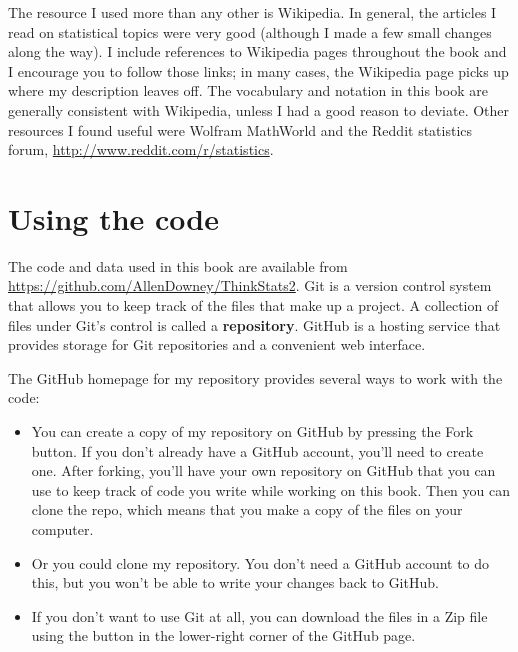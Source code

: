 \documentclass[12pt]{book}
\begin{document}
The resource I used more than any other is Wikipedia.  In general, the
articles I read on statistical topics were very good (although I made
a few small changes along the way).  I include references to Wikipedia
pages throughout the book and I encourage you to follow those links;
in many cases, the Wikipedia page picks up where my description leaves
off.  The vocabulary and notation in this book are generally
consistent with Wikipedia, unless I had a good reason to deviate.
Other resources I found useful were Wolfram MathWorld and 
the Reddit statistics forum, \url{http://www.reddit.com/r/statistics}.


\section{Using the code}
\label{code}

The code and data used in this book are available from
\url{https://github.com/AllenDowney/ThinkStats2}.  Git is a version
control system that allows you to keep track of the files that
make up a project.  A collection of files under Git's control is
called a {\bf repository}.  GitHub is a hosting service that provides
storage for Git repositories and a convenient web interface.

The GitHub homepage for my repository provides several ways to
work with the code:

\begin{itemize}

\item You can create a copy of my repository
on GitHub by pressing the {\sf Fork} button.  If you don't already
have a GitHub account, you'll need to create one.  After forking, you'll
have your own repository on GitHub that you can use to keep track
of code you write while working on this book.  Then you can
clone the repo, which means that you make a copy of the files
on your computer.

\item Or you could clone
my repository.  You don't need a GitHub account to do this, but you
won't be able to write your changes back to GitHub.

\item If you don't want to use Git at all, you can download the files
in a Zip file using the button in the lower-right corner of the
GitHub page.

\end{itemize}
\end{document}
